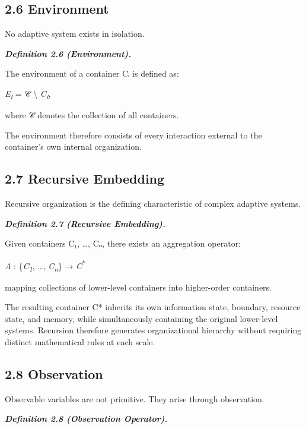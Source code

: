 \documentclass[
]{article}
\begin{document}
\hypertarget{environment}{%
\subsection{2.6 Environment}\label{environment}}

No adaptive system exists in isolation.

\emph{\textbf{Definition 2.6 (Environment).}}

The environment of a container Cᵢ is defined as:

\emph{E\textsubscript{i}} = 𝒞 \textbackslash{}
\emph{C\textsubscript{i}},

where 𝒞 denotes the collection of all containers.

The environment therefore consists of every interaction external to the
container's own internal organization.

\hypertarget{recursive-embedding}{%
\subsection{2.7 Recursive Embedding}\label{recursive-embedding}}

Recursive organization is the defining characteristic of complex
adaptive systems.

\emph{\textbf{Definition 2.7 (Recursive Embedding).}}

Given containers C₁, \ldots, Cₙ, there exists an aggregation operator:

\emph{A} : \{\emph{C\textsubscript{1}}, \ldots,
\emph{C\textsubscript{n}}\} → \emph{C}\textsuperscript{*}

mapping collections of lower-level containers into higher-order
containers.

The resulting container C* inherits its own information state, boundary,
resource state, and memory, while simultaneously containing the original
lower-level systems. Recursion therefore generates organizational
hierarchy without requiring distinct mathematical rules at each scale.

\hypertarget{observation}{%
\subsection{2.8 Observation}\label{observation}}

Observable variables are not primitive. They arise through observation.

\emph{\textbf{Definition 2.8 (Observation Operator).}}
\end{document}
